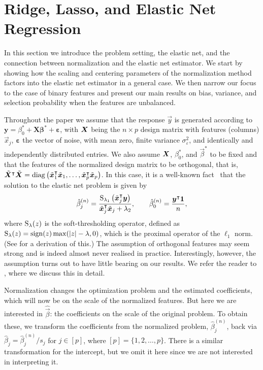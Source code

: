 \section{Ridge, Lasso, and Elastic Net Regression}%
\label{sec:theory}

In this section we introduce the problem setting, the elastic net, and the connection
between normalization and the elastic net estimator. We start by showing how the scaling
and centering parameters of the normalization method factors into the elastic net estimator
in a general case. We then narrow our focus to the case of binary features and present our
main results on bias, variance, and selection probability when the features are unbalanced.

Throughout the paper we assume that the response \(\vec{y}\) is generated according to
\(\bm{y} = \beta_0^* + \bm{X\beta}^* + \bm{\varepsilon}\), with \(\bm X\) being the \(n
\times p\) design matrix with features (columns) \(\vec x_j\), \(\bm{\varepsilon}\) the
vector of noise, with mean zero, finite variance \(\sigma_\varepsilon^2\), and identically
and independently distributed entries. We also assume \(\bm{X}\), \(\beta_0^*\), and
\(\vec{\beta}^*\) to be fixed and that the features of the normalized design matrix to be
orthogonal, that is, \(\tilde{\bm{X}}^\intercal \tilde{\bm{X}} =
\operatorname{diag}\left(\tilde{\bm{x}}_1^\intercal \tilde{\bm{x}}_1, \dots, \tilde{\bm{x}}_p^\intercal
\tilde{\bm{x}}_p\right)\). In this case, it is a well-known fact~\citep{tibshirani1996}
that the solution to the elastic net problem is given by
%
\begin{equation}
  \label{eq:orthogonal-solution-normalized}
  \hat{\beta}^{(n)}_j = \frac{\operatorname{S}_{\lambda_1}\left(\tilde{\bm{x}}_j^\intercal \bm{y}\right)}{\tilde{\bm{x}}_j^\intercal \tilde{\bm{x}}_j + \lambda_2},
  \qquad
  \hat{\beta}_0^{(n)} = \frac{\bm{y}^\intercal \bm{1}}{n},
\end{equation}
%
where \(\operatorname{S}_\lambda(z)\) is the soft-thresholding operator, defined as \(\operatorname{S}_\lambda(z) =
\operatorname{sign}(z) \max(|z| - \lambda, 0)\), which is the proximal operator of the \(\ell_1\) norm.
(See  for a derivation of this.) The assumption of
orthogonal features may seem strong and is indeed almost never realised in practice.
Interestingly, however, the assumption turns out to have little bearing on our results. We
refer the reader to , where we discuss this in detail.

Normalization changes the optimization problem and the estimated coefficients, which will
now be on the scale of the normalized features. But here we are interested in
\(\hat{\vec{\beta}}\): the coefficients on the scale of the original problem. To obtain
these, we transform the coefficients from the normalized problem, \(\hat\beta^{(n)}_j\),
back via \(\hat\beta_j = \hat\beta^{(n)}_j/s_j\) for \(j \in [p]\), where \([p] =
\{1,2,\dots,p\}\). There is a similar transformation for the intercept, but we omit it here
since we are not interested in interpreting it.

